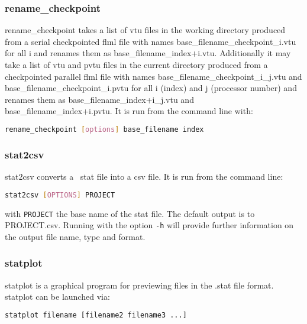 
\subsubsection{rename\_checkpoint}
\label{sec:rename_checkpoint}
rename\_checkpoint takes a list of vtu files in the working directory produced from a serial checkpointed flml file with names base\_filename\_checkpoint\_i.vtu for all i and renames them as base\_filename\_index+i.vtu. Additionally it may take a list of
vtu and pvtu files in the current directory produced from a checkpointed parallel flml file with names base\_filename\_checkpoint\_i\_j.vtu and base\_filename\_checkpoint\_i.pvtu for all i (index) and j (processor number) and renames them as base\_filename\_index+i\_j.vtu and base\_filename\_index+i.pvtu. It is run from the command line with:
\begin{lstlisting}[language = Bash]
rename_checkpoint [options] base_filename index
\end{lstlisting}


\subsubsection{stat2csv}
\label{sec:stat2csv}
stat2csv converts a \fluidity\ stat file into a csv file. It is run from the command line:
\begin{lstlisting}[language = Bash]
stat2csv [OPTIONS] PROJECT
\end{lstlisting}
with \lstinline[language = Bash]+PROJECT+ the base name of the stat file. The default output is to PROJECT.csv. Running with the option \lstinline[language = Bash]+-h+ will provide further information on the output file name, type and format.


\subsubsection{statplot}
\label{sec:statplot}

statplot is a graphical program for previewing files in the .stat file format.
statplot can be launched via:

\begin{lstlisting}[language = Bash]
statplot filename [filename2 filename3 ...]
\end{lstlisting}

